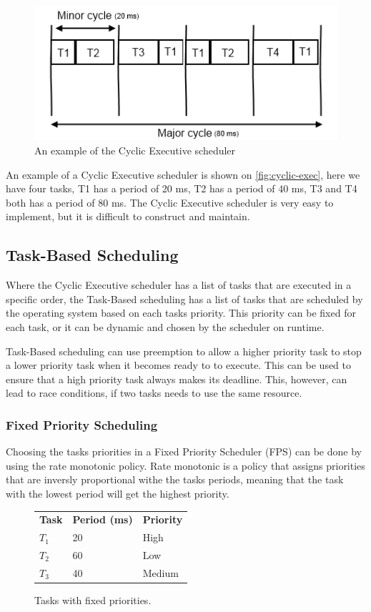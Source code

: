 \begin{figure}[hbtp]
\center
\includegraphics[width=.7\textwidth]{img/cyclic-exec.png}
\caption{An example of the Cyclic Executive scheduler} 
\label{fig:cyclic-exec} 
\end{figure}

An example of a Cyclic Executive scheduler is shown on \autoref{fig:cyclic-exec}, here we have four tasks, T1 has a period of 20 ms, T2 has a period of 40 ms, T3 and T4 both has a period of 80 ms.
The Cyclic Executive scheduler is very easy to implement, but it is difficult to construct and maintain.

\subsection{Task-Based Scheduling}
Where the Cyclic Executive scheduler has a list of tasks that are executed in a specific order, the Task-Based scheduling has a list of tasks that are scheduled by the operating system based on each tasks priority. This priority can be fixed for each task, or it can be dynamic and chosen by the scheduler on runtime.

Task-Based scheduling can use preemption to allow a higher priority task to stop a lower priority task when it becomes ready to to execute. This can be used to ensure that a high priority task always makes its deadline. This, however, can lead to race conditions, if two tasks needs to use the same resource.

\subsubsection{Fixed Priority Scheduling}
Choosing the tasks priorities in a Fixed Priority Scheduler (FPS) can be done by using the rate monotonic policy. Rate monotonic is a policy that assigns priorities that are inversly proportional withe the tasks periods, meaning that the task with the lowest period will get the highest priority.

\begin{figure}
\center
\begin{tabular}{ l | l | l }
    \hline                        
    \textbf{Task} & \textbf{Period (ms)} & \textbf{Priority}  \\
    $T_1$ & 20 & High \\
    $T_2$ & 60 & Low \\
    $T_3$ & 40 & Medium \\
    \hline  
\end{tabular}
\caption{Tasks with fixed priorities.}
\label{fig:fps}
\end{figure}

